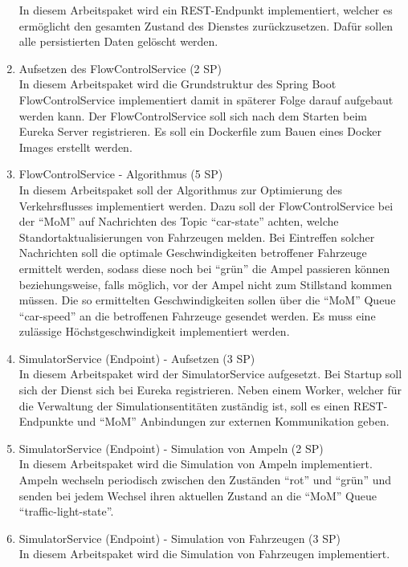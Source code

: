 \begin{enumerate}
 		In diesem Arbeitspaket wird ein REST-Endpunkt implementiert, welcher es ermöglicht den gesamten Zustand des Dienstes zurückzusetzen.
 		Dafür sollen alle persistierten Daten gelöscht werden.
  \item Aufsetzen des FlowControlService (2 SP)\\
  		In diesem Arbeitspaket wird die Grundstruktur des Spring Boot FlowControlService implementiert damit in späterer Folge darauf aufgebaut werden kann.
  		Der FlowControlService soll sich nach dem Starten beim Eureka Server registrieren.
  		Es soll ein Dockerfile zum Bauen eines Docker Images erstellt werden.
  \item FlowControlService - Algorithmus (5 SP)\\
  		In diesem Arbeitspaket soll der Algorithmus zur Optimierung des Verkehrsflusses implementiert werden.
  		Dazu soll der FlowControlService bei der \enquote{MoM} auf Nachrichten des Topic \enquote{car-state} achten, welche Standortaktualisierungen von Fahrzeugen melden.
  		Bei Eintreffen solcher Nachrichten soll die optimale Geschwindigkeiten betroffener Fahrzeuge ermittelt werden, sodass diese noch bei \enquote{grün} die Ampel passieren können beziehungsweise, falls möglich, vor der Ampel nicht zum Stillstand kommen müssen.
  		Die so ermittelten Geschwindigkeiten sollen über die \enquote{MoM} Queue \enquote{car-speed} an die betroffenen Fahrzeuge gesendet werden.
  		Es muss eine zulässige Höchstgeschwindigkeit implementiert werden.
  \item SimulatorService (Endpoint) - Aufsetzen (3 SP)\\
  		In diesem Arbeitspaket wird der SimulatorService aufgesetzt.
  		Bei Startup soll sich der Dienst sich bei Eureka registrieren.
  		Neben einem Worker, welcher für die Verwaltung der Simulationsentitäten zuständig ist, soll es einen REST-Endpunkte und \enquote{MoM} Anbindungen zur externen Kommunikation geben.
  \item SimulatorService (Endpoint) - Simulation von Ampeln (2 SP)\\
  		In diesem Arbeitspaket wird die Simulation von Ampeln implementiert.
  		Ampeln wechseln periodisch zwischen den Zuständen \enquote{rot} und \enquote{grün} und senden bei jedem Wechsel ihren aktuellen Zustand an die \enquote{MoM} Queue \enquote{traffic-light-state}.
  \item SimulatorService (Endpoint) - Simulation von Fahrzeugen (3 SP)\\
  		In diesem Arbeitspaket wird die Simulation von Fahrzeugen implementiert.

\end{enumerate}
